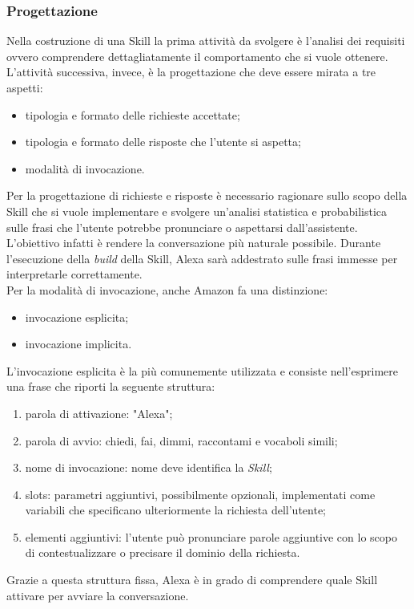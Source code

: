 		\subsubsection{Progettazione}
		Nella costruzione di una Skill la prima attività da svolgere è l'analisi dei requisiti ovvero comprendere dettagliatamente il comportamento che si vuole ottenere. L'attività successiva, invece, è la progettazione che deve essere mirata a tre aspetti:
		\begin{itemize}
			\item tipologia e formato delle richieste accettate;
			\item tipologia e formato delle risposte che l'utente si aspetta;
			\item modalità di invocazione.
		\end{itemize}
		Per la progettazione di richieste e risposte è necessario ragionare sullo scopo della Skill che si vuole implementare e svolgere un'analisi statistica e probabilistica sulle frasi che l'utente potrebbe pronunciare o aspettarsi dall'assistente. L'obiettivo infatti è rendere la conversazione più naturale possibile. Durante l'esecuzione della \textit{build} della Skill, Alexa sarà addestrato sulle frasi immesse per interpretarle correttamente. \\
		Per la modalità di invocazione, anche Amazon fa una distinzione:
		\begin{itemize}
			\item invocazione esplicita;
			\item invocazione implicita.
		\end{itemize}
		L'invocazione esplicita è la più comunemente utilizzata e consiste nell'esprimere una frase che riporti la seguente struttura:
		\begin{enumerate}
			\item parola di attivazione: "Alexa";
			\item parola di avvio: chiedi, fai, dimmi, raccontami e vocaboli simili;
			\item nome di invocazione: nome deve identifica la \textit{Skill};
			\item slots: parametri aggiuntivi, possibilmente opzionali, implementati come variabili che specificano ulteriormente la richiesta dell'utente;
			\item elementi aggiuntivi: l'utente può pronunciare parole aggiuntive con lo scopo di contestualizzare o precisare il dominio della richiesta.
		\end{enumerate}
		Grazie a questa struttura fissa, Alexa è in grado di comprendere quale Skill attivare per avviare la conversazione. \\
